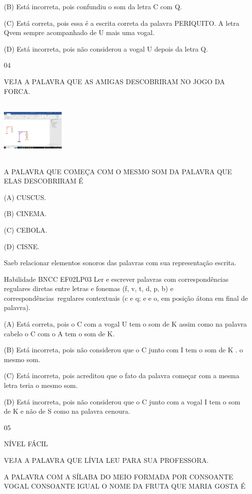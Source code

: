 {{{{{{(B) Está incorreta, pois confundiu o som da letra C com Q.

(C) Está correta, pois essa é a escrita correta da palavra PERIQUITO. A
letra Qvem sempre acompanhado de U mais uma vogal.

(D) Está incorreta, pois não considerou a vogal U depois da letra Q.

\num{04}

VEJA A PALAVRA QUE AS AMIGAS DESCOBRIRAM NO JOGO DA FORCA.

\includegraphics[width=1.24236in,height=1.17500in]{media/image166.png}

A PALAVRA QUE COMEÇA COM O MESMO SOM DA PALAVRA QUE ELAS DESCOBRIRAM É

(A) CUSCUS.

(B) CINEMA.

(C) CEBOLA.

(D) CISNE.

Saeb relacionar elementos sonoros das palavras com sua representação
escrita.

Habilidade BNCC EF02LP03 Ler e escrever palavras com correspondências
regulares diretas entre letras e fonemas (f, v, t, d, p, b) e
correspondências~regulares contextuais (c e q; e e o, em posição átona
em final de palavra).

(A) Está correta, pois o C com a vogal U tem o som de K assim como na
palavra cabelo o C com o A tem o som de K.

(B) Está incorreta, pois não considerou que o C junto com I tem o som de
K . o mesmo som.

(C) Está incorreta, pois acreditou que o fato da palavra começar com a
mesma letra teria o mesmo som.

(D) Está incorreta, pois não considerou que o C junto com a vogal I tem
o som de K e não de S como na palavra cenoura.

\num{05}

NÍVEL FÁCIL

VEJA A PALAVRA QUE LÍVIA LEU PARA SUA PROFESSORA.

A PALAVRA COM A SÍLABA DO MEIO FORMADA POR CONSOANTE VOGAL CONSOANTE
IGUAL O NOME DA FRUTA QUE MARIA GOSTA É

}}}}}}
